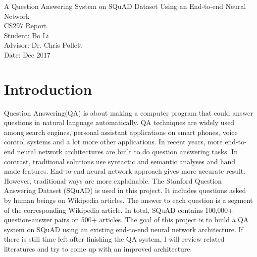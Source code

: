 \documentclass[12pt]{article}
\begin{document}
\begin{titlepage}
\begin{center}
        \vspace*{3cm}
        {\Huge A Question Answering System on SQuAD Dataset Using an End-to-end Neural Network}\\

        \vspace*{3cm}
        {\Huge CS297 Report}\\

        \vspace{3 cm}
        Student: Bo Li\\
        Advisor: Dr. Chris Pollett\\
        Date: Dec 2017

 \end{center}
\clearpage
\end{titlepage}

\begin{titlepage}
\tableofcontents
\clearpage
\end{titlepage}



\section{Introduction}

Question Answering(QA) is about making a computer program that could answer questions in natural language automatically. QA techniques are widely used among search engines, personal assistant applications on smart phones, voice control systems and a lot more other applications. In recent years, more end-to-end neural network architectures are built to do question answering tasks. In contrast, traditional solutions use syntactic and semantic analyses and hand made features. End-to-end neural network approach gives more accurate result. However, traditional ways are more explainable. The Stanford Question Answering Dataset (SQuAD) is used in this project. It includes questions asked by human beings on Wikipedia articles. The answer to each question is a segment of the corresponding Wikipedia article\cite{rajpurkar2016squad}. In total, SQuAD contains 100,000+ question-answer pairs on 500+ articles\cite{rajpurkar2016squad}. The goal of this project is to build a QA system on SQuAD using an existing end-to-end neural network architecture. If there is still time left after finishing the QA system, I will review related literatures and try to come up with an improved architecture.
\end{document}
